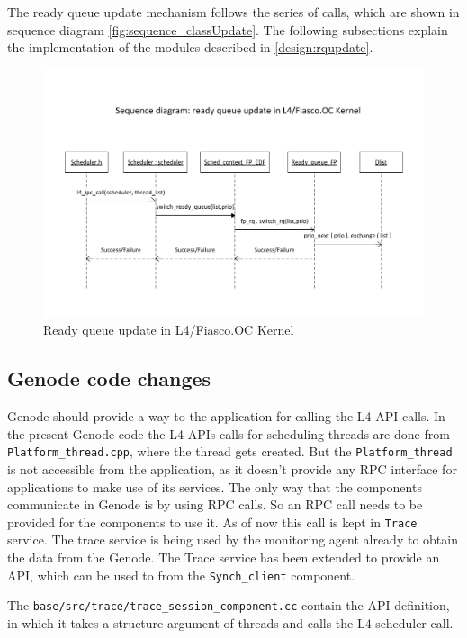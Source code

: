 The ready queue update mechanism follows the series of calls, which are shown in sequence diagram \ref{fig:sequence_classUpdate}. The following subsections explain the implementation of the modules described in \ref{design:rqupdate}.

\begin{figure}[h]
\centering
\includegraphics[width=1.0\linewidth]{figures/Drawing2}
\caption{Ready queue update in L4/Fiasco.OC Kernel}
\label{fig:Drawing2}
\end{figure}

\subsection{Genode code changes}

Genode should provide a way to the application for calling the L4 API calls. In the present Genode code the L4 APIs calls for scheduling threads are done from \texttt{Platform\_thread.cpp}, where the thread gets created. But the \texttt{Platform\_thread} is not accessible from the application, as it doesn't provide any RPC interface for applications to make use of its services. The only way that the components communicate in Genode is by using RPC calls. So an RPC call needs to be provided for the components to use it. As of now this call is kept in \texttt{Trace} service. The trace service is being used by the monitoring agent already to obtain the data from the Genode. The Trace service has been extended to provide an API, which can be used to from the \texttt{Synch\_client} component.

The \texttt{base/src/trace/trace\_session\_component.cc} contain the API definition, in which it takes a structure argument of threads and calls the L4 scheduler call.

